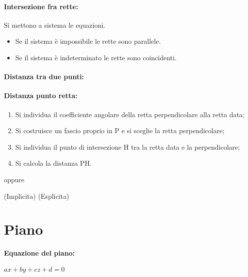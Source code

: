 \documentclass[a4paper]{article}
\begin{document}
                \paragraph{Intersezione fra rette:}
                        Si mettono a sistema le equazioni.
                        \begin{itemize}
                                \item Se il sistema \`{e} impossibile le rette sono parallele.
                                \item Se il sistema \`{e} indeterminato le rette sono coincidenti.
                        \end{itemize}

                \paragraph{Distanza tra due punti:}

                \paragraph{Distanza punto retta:}
                        \begin{enumerate}
                                \item Si individua il coefficiente angolare della retta perpendicolare alla retta data;
                                \item Si costruisce un fascio proprio in P e si sceglie la retta perpendicolare;
                                \item Si individua il punto di intersezione H tra la retta data e la perpendicolare;
                                \item Si calcola la distanza PH.
                        \end{enumerate}

                        oppure

                        (Implicita)  \qquad {} (Esplicita)

        \section*{Piano}
                \paragraph{Equazione del piano:}
                        $a x + b y + c z + d = 0$
\end{document}
